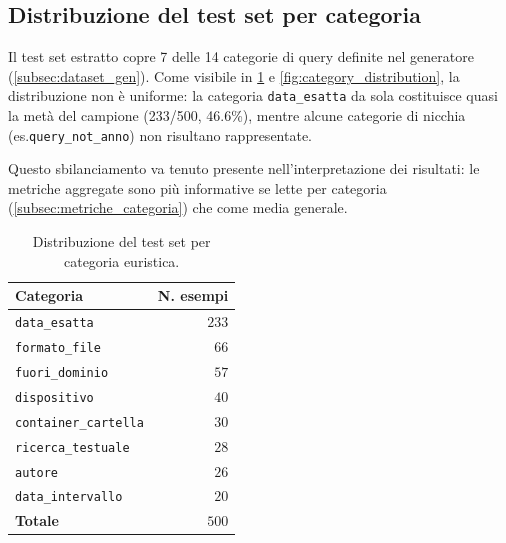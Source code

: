 \documentclass[12pt,a4paper,oneside]{book}
\newcommand{\code}[1]{\colorbox{light-gray}{\texttt{#1}}}
\begin{document}
\newpage
\subsection{Distribuzione del test set per categoria}\label{subsec:distribuzione_test}

\vspace{0.5em}

Il test set estratto copre 7 delle 14 categorie di query definite nel generatore (\cref{subsec:dataset_gen}). Come visibile in \cref{tab:distribuzione_test} e \cref{fig:category_distribution}, la distribuzione non è uniforme: la categoria \code{data\_esatta} da sola costituisce quasi la metà del campione (233/500, 46.6\%), mentre alcune categorie di nicchia (es.\@ \code{query\_not\_anno}) non risultano rappresentate. 

Questo sbilanciamento va tenuto presente nell'interpretazione dei risultati: le metriche aggregate sono più informative se lette per categoria (\cref{subsec:metriche_categoria}) che come media generale.

\begin{table}[htbp]
    \centering
    \begin{tabularx}{0.85\textwidth}{X r}
    \toprule
    Categoria          & N. esempi  \\
    \midrule
    \texttt{data\_esatta}        & $233$         \\
    \texttt{formato\_file}       & $66$          \\
    \texttt{fuori\_dominio}      & $57$          \\
    \texttt{dispositivo}         & $40$          \\
    \texttt{container\_cartella} & $30$          \\
    \texttt{ricerca\_testuale}   & $28$          \\
    \texttt{autore}              & $26$          \\
    \texttt{data\_intervallo}    & $20$          \\
    \midrule
    \textbf{Totale}    & \textbf{$500$}\\
    \bottomrule
    \end{tabularx}
    \caption{Distribuzione del test set per categoria euristica.}\label{tab:distribuzione_test}
\end{table}
\end{document}
